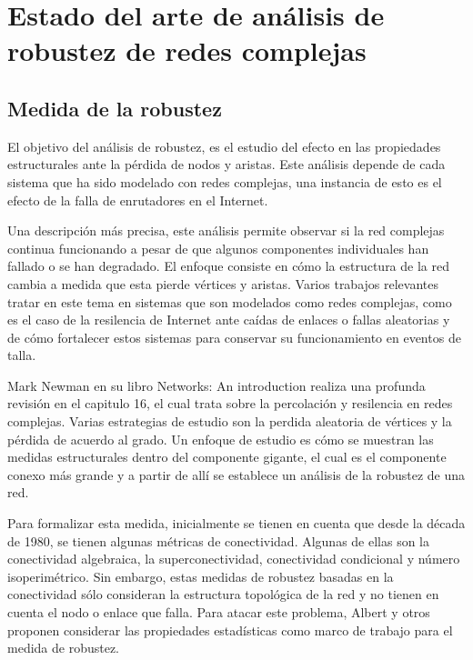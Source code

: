 \section{Estado del arte de análisis de robustez de redes complejas}

\subsection{Medida de la robustez}

El objetivo del análisis de robustez, es el estudio del efecto en las propiedades estructurales ante la pérdida de nodos y aristas\cite{Albert2000}. Este análisis depende de cada sistema que ha sido modelado con redes complejas, una instancia de esto es el efecto de la falla de enrutadores en el Internet.

Una descripción más precisa, este análisis permite observar si la red complejas continua funcionando a pesar de que algunos componentes individuales han fallado o se han degradado. El enfoque consiste en cómo la estructura de la red cambia a medida que esta pierde vértices y aristas. Varios trabajos relevantes tratar en este tema en sistemas que son modelados como redes complejas, como es el caso de la resilencia de Internet ante caídas de enlaces o fallas aleatorias\cite{Cohen2000} y de cómo fortalecer estos sistemas para conservar su funcionamiento en eventos de talla\cite{Cohen2003}.

Mark Newman en su libro Networks: An introduction\cite{Newman2010} realiza una profunda revisión en el capitulo 16, el cual trata sobre la percolación y resilencia en redes complejas. Varias estrategias de estudio son la perdida aleatoria de vértices y la pérdida de acuerdo al grado. Un enfoque de estudio es cómo se muestran las medidas estructurales dentro del componente gigante, el cual es el componente conexo más grande y a partir de allí se establece un análisis de la robustez de una red.

Para formalizar esta medida, inicialmente se tienen en cuenta que desde la década de 1980, se tienen algunas métricas de conectividad. Algunas de ellas son la conectividad algebraica\cite{Fiedler1973}, la superconectividad\cite{Bauer1985}, conectividad condicional\cite{Harary1983} y número isoperimétrico\cite{Mohar1989}. Sin embargo, estas medidas de robustez basadas en la conectividad sólo consideran la estructura topológica de la red y no tienen en cuenta el nodo o enlace que falla. Para atacar este problema, Albert y otros\cite{Albert2000} proponen considerar las propiedades estadísticas como marco de trabajo para el medida de robustez. 

